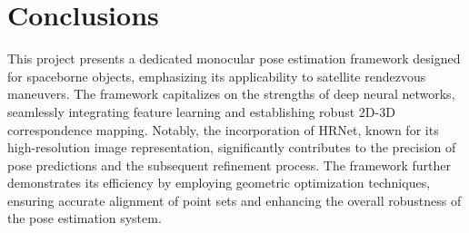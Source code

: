 \section{Conclusions}
This project presents a dedicated monocular pose estimation framework designed for spaceborne objects, emphasizing its applicability to satellite rendezvous maneuvers. The framework capitalizes on the strengths of deep neural networks, seamlessly integrating feature learning and establishing robust 2D-3D correspondence mapping. Notably, the incorporation of HRNet, known for its high-resolution image representation, significantly contributes to the precision of pose predictions and the subsequent refinement process. The framework further demonstrates its efficiency by employing geometric optimization techniques, ensuring accurate alignment of point sets and enhancing the overall robustness of the pose estimation system.